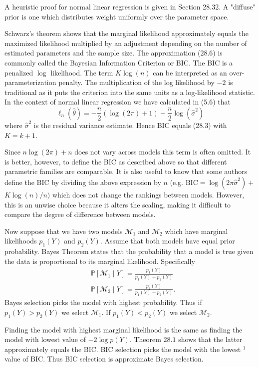 \documentclass[10pt]{article}
\begin{document}
A heuristic proof for normal linear regression is given in Section 28.32. A "diffuse" prior is one which distributes weight uniformly over the parameter space.

Schwarz's theorem shows that the marginal likelihood approximately equals the maximized likelihood multiplied by an adjustment depending on the number of estimated parameters and the sample size. The approximation (28.6) is commonly called the Bayesian Information Criterion or BIC. The BIC is a penalized $\log$ likelihood. The term $K \log (n)$ can be interpreted as an over-parameterization penalty. The multiplication of the log likelihood by $-2$ is traditional as it puts the criterion into the same units as a log-likelihood statistic. In the context of normal linear regression we have calculated in (5.6) that
$$
\ell_{n}(\widehat{\theta})=-\frac{n}{2}(\log (2 \pi)+1)-\frac{n}{2} \log \left(\widehat{\sigma}^{2}\right)
$$
where $\widehat{\sigma}^{2}$ is the residual variance estimate. Hence BIC equals (28.3) with $K=k+1$.

Since $n \log (2 \pi)+n$ does not vary across models this term is often omitted. It is better, however, to define the BIC as described above so that different parametric families are comparable. It is also useful to know that some authors define the BIC by dividing the above expression by $n$ (e.g. $\mathrm{BIC}=\log \left(2 \pi \widehat{\sigma}^{2}\right)+$ $K \log (n) / n)$ which does not change the rankings between models. However, this is an unwise choice because it alters the scaling, making it difficult to compare the degree of difference between models.

Now suppose that we have two models $\mathscr{M}_{1}$ and $\mathscr{M}_{2}$ which have marginal likelihoods $p_{1}(Y)$ and $p_{2}(Y)$. Assume that both models have equal prior probability. Bayes Theorem states that the probability that a model is true given the data is proportional to its marginal likelihood. Specifically
$$
\begin{aligned}
&\mathbb{P}\left[\mathscr{M}_{1} \mid Y\right]=\frac{p_{1}(Y)}{p_{1}(Y)+p_{2}(Y)} \\
&\mathbb{P}\left[\mathscr{M}_{2} \mid Y\right]=\frac{p_{2}(Y)}{p_{1}(Y)+p_{2}(Y)} .
\end{aligned}
$$
Bayes selection picks the model with highest probability. Thus if $p_{1}(Y)>p_{2}(Y)$ we select $\mathscr{M}_{1}$. If $p_{1}(Y)<p_{2}(Y)$ we select $\mathscr{M}_{2}$.

Finding the model with highest marginal likelihood is the same as finding the model with lowest value of $-2 \log p(Y)$. Theorem $28.1$ shows that the latter approximately equals the BIC. BIC selection picks the model with the lowest ${ }^{1}$ value of BIC. Thus BIC selection is approximate Bayes selection.
\end{document}
